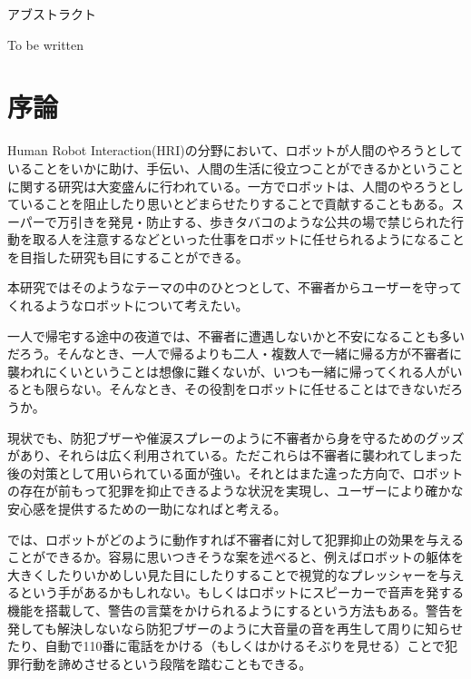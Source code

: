 \documentclass{kuisthesis}
\date{平成31年2月8日}				%
\begin{document}
\maketitle

\begin{jabstract}				%
アブストラクト
\end{jabstract}

\begin{eabstract}				%
To be written
\end{eabstract}

\tableofcontents






\section{序論}

Human Robot Interaction(HRI)の分野において、ロボットが人間のやろうとしていることをいかに助け、手伝い、人間の生活に役立つことができるかということに関する研究は大変盛んに行われている。一方でロボットは、人間のやろうとしていることを阻止したり思いとどまらせたりすることで貢献することもある。スーパーで万引きを発見・防止する、歩きタバコのような公共の場で禁じられた行動を取る人を注意するなどといった仕事をロボットに任せられるようになることを目指した研究も目にすることができる。

本研究ではそのようなテーマの中のひとつとして、不審者からユーザーを守ってくれるようなロボットについて考えたい。

一人で帰宅する途中の夜道では、不審者に遭遇しないかと不安になることも多いだろう。そんなとき、一人で帰るよりも二人・複数人で一緒に帰る方が不審者に襲われにくいということは想像に難くないが、いつも一緒に帰ってくれる人がいるとも限らない。そんなとき、その役割をロボットに任せることはできないだろうか。

現状でも、防犯ブザーや催涙スプレーのように不審者から身を守るためのグッズがあり、それらは広く利用されている。ただこれらは不審者に襲われてしまった後の対策として用いられている面が強い。それとはまた違った方向で、ロボットの存在が前もって犯罪を抑止できるような状況を実現し、ユーザーにより確かな安心感を提供するための一助になればと考える。

では、ロボットがどのように動作すれば不審者に対して犯罪抑止の効果を与えることができるか。容易に思いつきそうな案を述べると、例えばロボットの躯体を大きくしたりいかめしい見た目にしたりすることで視覚的なプレッシャーを与えるという手があるかもしれない。もしくはロボットにスピーカーで音声を発する機能を搭載して、警告の言葉をかけられるようにするという方法もある。警告を発しても解決しないなら防犯ブザーのように大音量の音を再生して周りに知らせたり、自動で110番に電話をかける（もしくはかけるそぶりを見せる）ことで犯罪行動を諦めさせるという段階を踏むこともできる。
\end{document}
